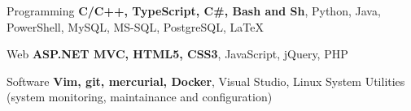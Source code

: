 
\begin{cvskills}

\cvskill%
  {Programming} %
  {\textbf{C/C++, TypeScript, C\#, Bash and Sh}, Python, Java, PowerShell, MySQL, MS-SQL, PostgreSQL,
   LaTeX} %

\cvskill%
  {Web} %
  {\textbf{ASP.NET MVC, HTML5, CSS3}, JavaScript, jQuery, PHP} %

\cvskill%
  {Software} %
  {\textbf{Vim, git, mercurial, Docker}, Visual Studio, Linux System Utilities (system
   monitoring, maintainance and configuration)} %

\end{cvskills}
